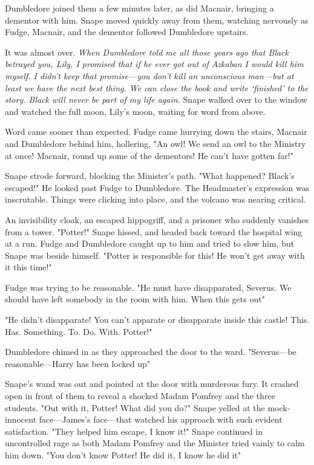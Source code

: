 Dumbledore joined them a few minutes later, as did Macnair, bringing a dementor with him. Snape moved quickly away from them, watching nervously as Fudge, Macnair, and the dementor followed Dumbledore upstairs.

It was almost over. \emph{When Dumbledore told me all those years ago that Black betrayed you, Lily, I promised that if he ever got out of Azkaban I would kill him myself. I didn't keep that promise—you don't kill an unconscious man—but at least we have the next best thing. We can close the book and write `finished' to the story. Black will never be part of my life again.} Snape walked over to the window and watched the full moon, Lily's moon, waiting for word from above.

Word came sooner than expected. Fudge came hurrying down the stairs, Macnair and Dumbledore behind him, hollering, "An owl! We send an owl to the Ministry at once! Macnair, round up some of the dementors! He can't have gotten far!"

Snape strode forward, blocking the Minister's path. "What happened? Black's escaped!" He looked past Fudge to Dumbledore. The Headmaster's expression was inscrutable. Things were clicking into place, and the volcano was nearing critical.

An invisibility cloak, an escaped hippogriff, and a prisoner who suddenly vanishes from a tower. "Potter!" Snape hissed, and headed back toward the hospital wing at a run. Fudge and Dumbledore caught up to him and tried to slow him, but Snape was beside himself. "Potter is responsible for this! He won't get away with it this time!"

Fudge was trying to be reasonable. "He must have disapparated, Severus. We should have left somebody in the room with him. When this gets out{\el}"

"He didn't disapparate! You can't apparate or disapparate inside this castle! This. Has. Something. To. Do. With. Potter!"

Dumbledore chimed in as they approached the door to the ward. "Severus—be reasonable—Harry has been locked up{\el}"

Snape's wand was out and pointed at the door with murderous fury. It crashed open in front of them to reveal a shocked Madam Pomfrey and the three students. "Out with it, Potter! What did you do?" Snape yelled at the mock-innocent face—James's face—that watched his approach with such evident satisfaction. "They helped him escape, I know it!" Snape continued in uncontrolled rage as both Madam Pomfrey and the Minister tried vainly to calm him down. "You don't know Potter! He did it, I know he did it{\el}"

